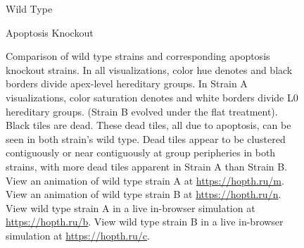 \begin{figure}[!htbp]
\begin{center}
\begin{minipage}[t]{0.5\linewidth}
\vspace{1.0ex}

\hspace*{\fill}%
\begin{minipage}[t]{0.05\linewidth}
\vspace{0pt} %
\end{minipage}%
\hfill
\begin{minipage}[t]{0.45\linewidth}
\centering
\vspace{0pt} %
Wild Type
\end{minipage}%
\hfill
\begin{minipage}[t]{0.45\linewidth}
\centering
\vspace{0pt} %
Apoptosis Knockout
\end{minipage}%
\hspace*{\fill}
\end{minipage}

\caption{
Comparison of wild type strains and corresponding apoptosis knockout strains.
In all visualizations, color hue denotes and black borders divide apex-level hereditary groups.
In Strain A visualizations, color saturation denotes and white borders divide L0 hereditary groups.
(Strain B evolved under the flat treatment).
Black tiles are dead.
These dead tiles, all due to apoptosis, can be seen in both strain's wild type.
Dead tiles appear to be clustered contiguously or near contiguously at group peripheries in both strains, with more dead tiles apparent in Strain A than Strain B.
View an animation of wild type strain A at \url{https://hopth.ru/m}.
View an animation of wild type strain B at \url{https://hopth.ru/n}.
View wild type strain A in a live in-browser simulation at \url{https://hopth.ru/b}.
View wild type strain B in a live in-browser simulation at \url{https://hopth.ru/c}.
}
\label{fig:ko-apoptosis}
\end{center}
\end{figure}
